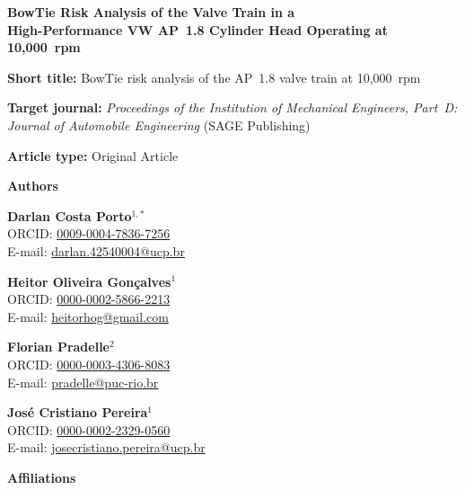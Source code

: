 \documentclass[11pt,a4paper]{article}
\begin{document}
\begin{center}
{\Large\bfseries BowTie Risk Analysis of the Valve Train in a\\
High-Performance VW AP~1.8 Cylinder Head Operating at 10{,}000~rpm\par}
\end{center}

\bigskip

\noindent\textbf{Short title:} BowTie risk analysis of the AP~1.8
valve train at 10{,}000~rpm

\bigskip

\noindent\textbf{Target journal:} \emph{Proceedings of the Institution
of Mechanical Engineers, Part~D: Journal of Automobile Engineering}
(SAGE Publishing)

\bigskip

\noindent\textbf{Article type:} Original Article

\bigskip\bigskip

\noindent\textbf{Authors}

\medskip

\noindent\textbf{Darlan Costa Porto}$^{1,*}$\\
ORCID: \href{https://orcid.org/0009-0004-7836-7256}{0009-0004-7836-7256}\\
E-mail: \href{mailto:darlan.42540004@ucp.br}{darlan.42540004@ucp.br}

\medskip

\noindent\textbf{Heitor Oliveira Gon\c{c}alves}$^{1}$\\
ORCID: \href{https://orcid.org/0000-0002-5866-2213}{0000-0002-5866-2213}\\
E-mail: \href{mailto:heitorhog@gmail.com}{heitorhog@gmail.com}

\medskip

\noindent\textbf{Florian Pradelle}$^{2}$\\
ORCID: \href{https://orcid.org/0000-0003-4306-8083}{0000-0003-4306-8083}\\
E-mail: \href{mailto:pradelle@puc-rio.br}{pradelle@puc-rio.br}

\medskip

\noindent\textbf{Jos\'e Cristiano Pereira}$^{1}$\\
ORCID: \href{https://orcid.org/0000-0002-2329-0560}{0000-0002-2329-0560}\\
E-mail: \href{mailto:josecristiano.pereira@ucp.br}{josecristiano.pereira@ucp.br}

\bigskip\bigskip

\noindent\textbf{Affiliations}
\end{document}
